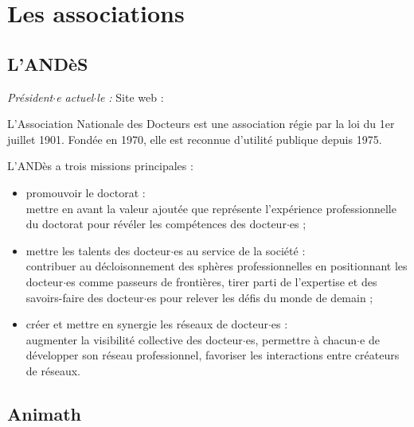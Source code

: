 \chapter{Les associations}


\section{L'AND\`eS}

\emph{Pr\'esident$\cdot$e actuel$\cdot$le : } \hfill Site web : 
\smallskip

L'Association Nationale des Docteurs est une association r\'egie par la loi du 1er juillet 1901.
Fond\'ee en 1970, elle est reconnue d'utilit\'e publique depuis 1975.

L'AND\`es a trois missions principales :
\begin{itemize}
\item promouvoir le doctorat :\\
mettre en avant la valeur ajout\'ee que repr\'esente l'exp\'erience professionnelle du doctorat pour r\'ev\'eler les comp\'etences des docteur$\cdot$es ;
\item mettre les talents des docteur$\cdot$es au service de la soci\'et\'e :\\
    contribuer au d\'ecloisonnement des sph\`eres professionnelles en positionnant les docteur$\cdot$es comme \og{}passeurs de fronti\`eres\fg{},
    tirer parti de l'expertise et des savoirs-faire des docteur$\cdot$es pour relever les d\'efis du monde de demain ;
\item cr\'eer et mettre en synergie les r\'eseaux de docteur$\cdot$es :\\
    augmenter la visibilit\'e collective des docteur$\cdot$es,
    permettre \`a chacun$\cdot$e de d\'evelopper son r\'eseau professionnel,
    favoriser les interactions entre cr\'eateurs de r\'eseaux.
\end{itemize}


\section{Animath}
\label{animath}
 
